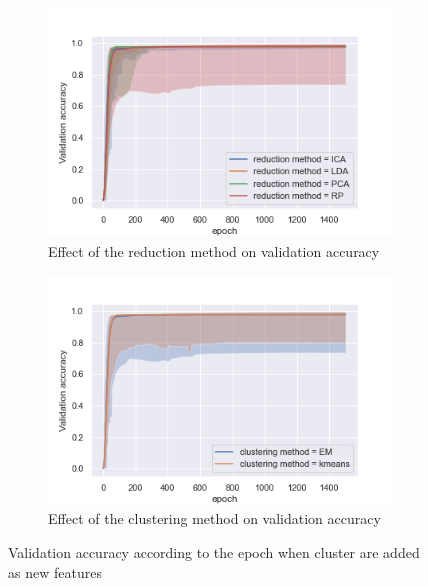\documentclass[twocolumn, 10pt]{article}
\begin{document}
			\begin{figure}[h]
			\centering
				\begin{subfigure}[t]{0.7\columnwidth}
					\centering
					\includegraphics[width=\linewidth]{../graphics/clusper_all_epoch_val_categorical_accuracy_reduction_method.png}
					\caption{Effect of the reduction method on validation accuracy}
					\label{fig:clusper_all_rm}
				\end{subfigure}
				\begin{subfigure}[t]{0.7\columnwidth}
					\centering
					\includegraphics[width=\linewidth]{../graphics/clusper_all_epoch_val_categorical_accuracy_clustering_method.png}
					\caption{Effect of the clustering method on validation accuracy}
					\label{fig:clusper_all_cm}
				\end{subfigure}
				\caption{Validation accuracy according to the epoch when cluster are added as new features}
				\label{fig:clusper_all}
			\end{figure}
\end{document}
